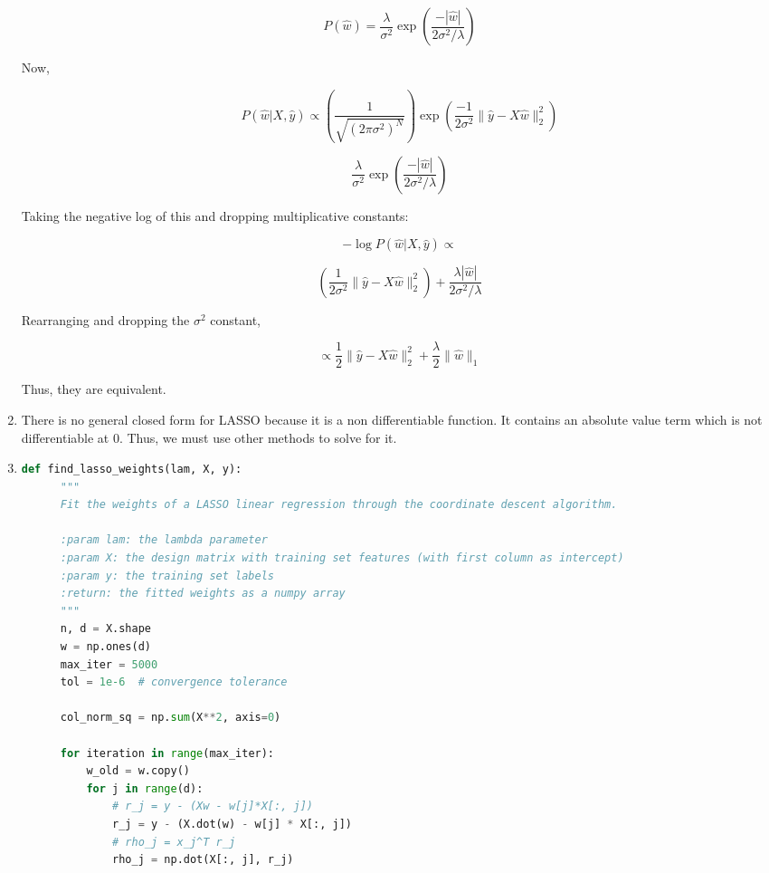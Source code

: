 \documentclass[submit]{../harvardml}
\begin{document}
\begin{tcolorbox}[title=Solution, colback=white, colframe=black, breakable]
\begin{enumerate}
      \[
      P(\hat{w}) = \frac{\lambda}{\sigma^2} \exp \left( \frac{-|\hat{w}|}{2\sigma^2 / \lambda} \right)
      \]
      
      Now,
      
      \[
      P(\hat{w} | X, \hat{y}) \propto \left( \frac{1}{\sqrt{(2\pi \sigma^2)^N}} \right) \exp \left( \frac{-1}{2\sigma^2} \| \hat{y} - X\hat{w} \|_2^2 \right)
      \]
      
      \[
      \frac{\lambda}{\sigma^2} \exp \left( \frac{-|\hat{w}|}{2\sigma^2 / \lambda} \right)
      \]
      
      Taking the negative log of this and dropping multiplicative constants:
      
      \[
      -\log P(\hat{w} | X, \hat{y}) \propto
      \]
      
      \[
      \left( \frac{1}{2\sigma^2} \| \hat{y} - X\hat{w} \|_2^2 \right) + \frac{\lambda |\hat{w}|}{2\sigma^2 / \lambda}
      \]
      
      Rearranging and dropping the \(\sigma^2\) constant,
      
      \[
      \propto \frac{1}{2} \| \hat{y} - X\hat{w} \|_2^2 + \frac{\lambda}{2} \| \hat{w} \|_1
      \]
      
      Thus, they are equivalent.



      \item There is no general closed form for LASSO because it is a non differentiable function. It contains an absolute value term which is not differentiable at 0. Thus, we must use other methods to solve for it.
      \item 
      \begin{lstlisting}[language=Python]
  def find_lasso_weights(lam, X, y):
      """
      Fit the weights of a LASSO linear regression through the coordinate descent algorithm.
      
      :param lam: the lambda parameter
      :param X: the design matrix with training set features (with first column as intercept)
      :param y: the training set labels
      :return: the fitted weights as a numpy array
      """
      n, d = X.shape
      w = np.ones(d)
      max_iter = 5000
      tol = 1e-6  # convergence tolerance
      
      col_norm_sq = np.sum(X**2, axis=0)
      
      for iteration in range(max_iter):
          w_old = w.copy()
          for j in range(d):
              # r_j = y - (Xw - w[j]*X[:, j])
              r_j = y - (X.dot(w) - w[j] * X[:, j])
              # rho_j = x_j^T r_j
              rho_j = np.dot(X[:, j], r_j)
              

\end{lstlisting}
\end{enumerate}
\end{tcolorbox}
\end{document}
